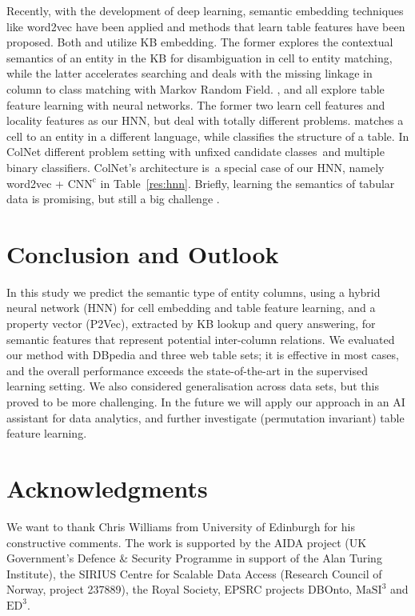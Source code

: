 \documentclass{article}
\begin{document}
Recently, with the development of deep learning, semantic embedding techniques like word2vec \cite{mikolov2013distributed} have been applied and 
methods that learn table features have been proposed.
Both \cite{efthymiou2017matching} 
and \cite{kunihiro2019meimei} utilize KB embedding.
The former explores the contextual semantics of an entity in the KB for disambiguation in cell to entity matching, 
while the latter accelerates searching and deals with the missing linkage in column to class matching with Markov Random Field.
\cite{luo2018cross}, \cite{nishida2017understanding} and \cite{chen2019colnet} all explore table feature learning with neural networks.
The former two learn cell features and locality features as our HNN, but deal with totally different problems.
\cite{luo2018cross} matches a cell to an entity in a different language, while \cite{nishida2017understanding} classifies the structure of a table.
In ColNet \cite{chen2019colnet we predict column types with a} different problem setting with unfixed candidate classes~and multiple binary classifiers. 
ColNet's architecture is~a special case of our HNN, namely word2vec + $\text{CNN}^{\text{c}}$ in Table~\ref{res:hnn}.
Briefly, learning the semantics of tabular data is promising, but still a big challenge \cite{thirumuruganathan2018data}.

\section{Conclusion and Outlook}\label{sec:conclution}
In this study we predict the semantic type of entity columns, 
using a hybrid neural network (HNN) for cell embedding and table feature learning,
and a property vector (P2Vec), extracted by KB lookup and query answering, for semantic features that represent potential inter-column relations.
We evaluated our method with DBpedia and three web table sets;
it is effective in most cases, and the overall performance exceeds the state-of-the-art in the supervised learning setting. 
We also considered generalisation across data sets, but this proved to be more challenging.
In the future we will apply our approach in an AI assistant for data analytics, and further investigate (permutation invariant) table feature learning.


\section{Acknowledgments}
We want to thank Chris Williams from University of Edinburgh for his constructive comments.
The work is supported by the AIDA project (UK Government's Defence \& Security Programme in support of the Alan Turing Institute), 
the SIRIUS Centre for Scalable Data Access (Research Council of Norway, project 237889),
the Royal Society,
EPSRC projects DBOnto, $\text{MaSI}^{\text{3}}$ and $\text{ED}^{\text{3}}$. 



\end{document}
